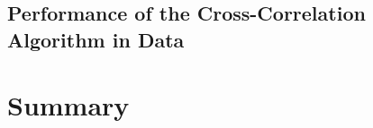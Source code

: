 \documentclass{cmspaper}
\begin{document}
\subsection{Performance of the Cross-Correlation Algorithm in Data}
\label{sec:resdata}

\FloatBarrier

\section{Summary}
\label{sec:conclusion}

\FloatBarrier

\printbibliography[heading=bibnumbered,title={References}]
\end{document}
